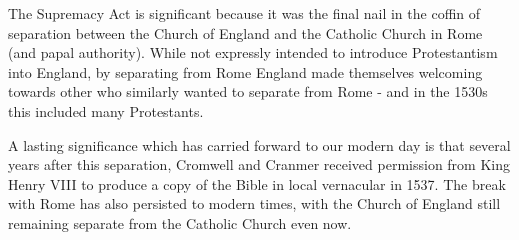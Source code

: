 \documentclass[12pt]{turabian-researchpaper}
\begin{document}
The Supremacy Act is significant because it was the final nail in the coffin of separation between the Church of England and the Catholic Church in Rome (and papal authority). While not expressly intended to introduce Protestantism into England, by separating from Rome England made themselves welcoming towards other who similarly wanted to separate from Rome - and in the 1530s this included many Protestants.\autocite[pg.225]{woodbridge2013}

A lasting significance which has carried forward to our modern day is that several years after this separation, Cromwell and Cranmer received permission from King Henry VIII to produce a copy of the Bible in local vernacular in 1537.\autocite[pg.226]{woodbridge2013} The break with Rome has also persisted to modern times, with the Church of England still remaining separate from the Catholic Church even now.
\newpage
\printbibliography
\end{document}
